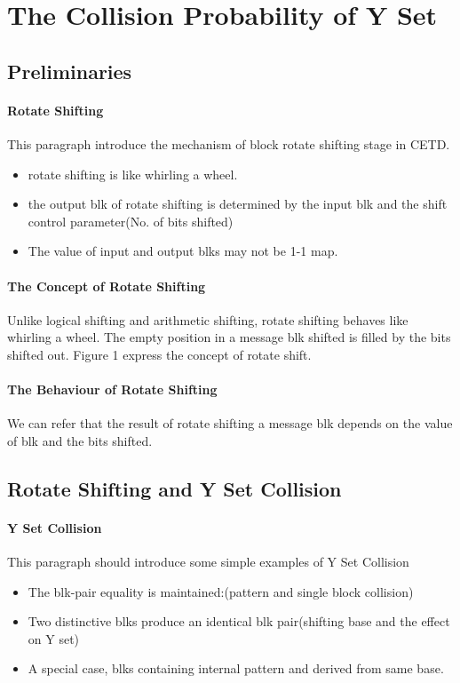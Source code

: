 \documentclass{article}
\begin{document}
\section{The Collision Probability of Y Set}
\subsection{Preliminaries}
\paragraph{Rotate Shifting}
This paragraph introduce the mechanism of block rotate shifting stage in CETD. 
\begin{itemize}
	\item rotate shifting is like whirling a wheel.
	\item the output blk of rotate shifting is determined by the input blk and the shift control parameter(No. of bits shifted)
	\item The value of input and output blks may not be 1-1 map.
\end{itemize}
\paragraph{The Concept of Rotate Shifting}
Unlike logical shifting and arithmetic shifting, rotate shifting behaves like whirling a wheel. The empty position in a message blk shifted is filled by the bits shifted out. Figure 1 express the concept of rotate shift. 
\paragraph{The Behaviour of Rotate Shifting}
We can refer that the result of rotate shifting a message blk depends on the value of blk and the bits shifted.  

\subsection{Rotate Shifting and Y Set Collision}
\paragraph{Y Set Collision}
This paragraph should introduce some simple examples of Y Set Collision 
\begin{itemize}
	\item The blk-pair equality is maintained:(pattern and single block collision)
	\item Two distinctive blks produce an identical blk pair(shifting base and the effect on Y set)
	\item A special case, blks containing internal pattern and derived from same base. 
\end{itemize}
\end{document}
